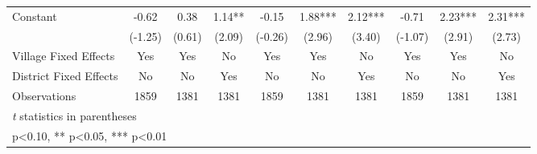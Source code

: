 \begin{sidewaystable}[htbp]
\begin{tabular}{l*{9}{c}}
Constant        &    -0.62   &     0.38   &     1.14** &    -0.15   &     1.88***&     2.12***&    -0.71   &     2.23***&     2.31***\\
                &  (-1.25)   &   (0.61)   &   (2.09)   &  (-0.26)   &   (2.96)   &   (3.40)   &  (-1.07)   &   (2.91)   &   (2.73)   \\
Village Fixed Effects&      Yes   &      Yes   &       No   &      Yes   &      Yes   &       No   &      Yes   &      Yes   &       No   \\
District Fixed Effects&       No   &       No   &      Yes   &       No   &       No   &      Yes   &       No   &       No   &      Yes   \\
\midrule
Observations    &     1859   &     1381   &     1381   &     1859   &     1381   &     1381   &     1859   &     1381   &     1381   \\
\bottomrule
\multicolumn{10}{l}{\footnotesize \textit{t} statistics in parentheses}\\
\multicolumn{10}{l}{\footnotesize * p<0.10, ** p<0.05, *** p<0.01}\\
\end{tabular}
\end{sidewaystable}
